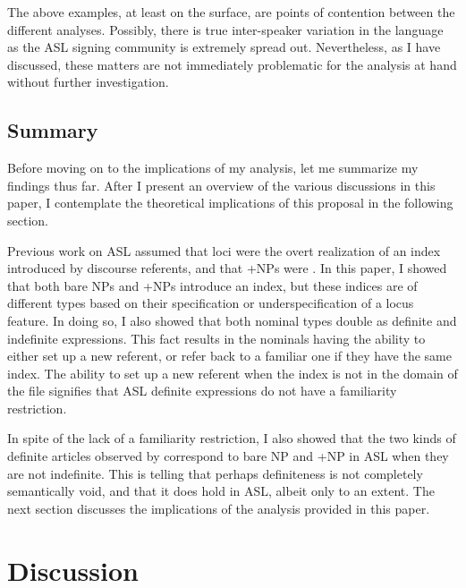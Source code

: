 \documentclass[output=paper,
modfonts
]{langscibook}
\begin{document}
The above examples, at least on the surface, are points of contention between the different analyses. Possibly, there is true inter-speaker variation in the language as the ASL signing community is extremely spread out. Nevertheless, as I have discussed, these matters are not immediately problematic for the analysis at hand without further investigation. 

\subsection{Summary}

Before moving on to the implications of my analysis, let me summarize my findings thus far. After I present an overview of the various discussions in this paper, I contemplate the theoretical implications of this proposal in the following section. 

Previous work on ASL assumed that loci were the overt realization of an index introduced by discourse referents, and that +NPs were . In this paper, I showed that both bare NPs and +NPs introduce an index, but these indices are of different types based on their specification or underspecification of a locus feature. In doing so, I also showed that both nominal types double as definite and indefinite expressions. This fact results in the nominals having the ability to either set up a new referent, or refer back to a familiar one if they have the same index. The ability to set up a new referent when the index is not in the domain of the file signifies that ASL definite expressions do not have a familiarity restriction. 

In spite of the lack of a familiarity restriction, I also showed that the two kinds of definite articles observed by \citet{Schwarz2009,Schwarz2013} correspond to bare NP and +NP in ASL when they are not indefinite. This is telling that perhaps definiteness is not completely semantically void, and that it does hold in ASL, albeit only to an extent. The next section discusses the implications of the analysis provided in this paper. 

\section{Discussion}\label{sec:irani:5}
\end{document}
